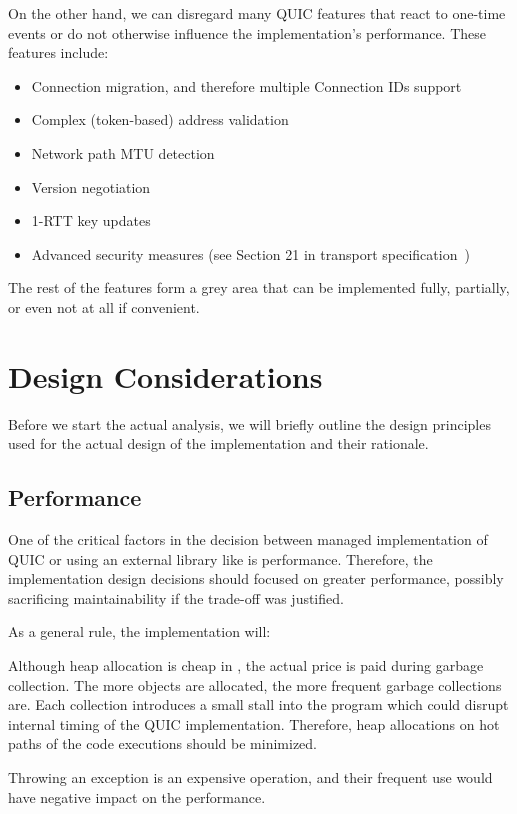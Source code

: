 On the other hand, we can disregard many QUIC features that react to one-time events or do not
otherwise influence the implementation's performance. These features include:

\begin{itemize}

    \item Connection migration, and therefore multiple Connection IDs support

    \item Complex (token-based) address validation

    \item Network path MTU detection

    \item Version negotiation

    \item 1-RTT key updates

    \item Advanced security measures (see Section 21 in transport
specification~\cite{draft-ietf-quic-transport})

\end{itemize}

The rest of the features form a grey area that can be implemented fully, partially, or even not at
all if convenient.

\section{Design Considerations}

Before we start the actual analysis, we will briefly outline the design principles used for the
actual design of the implementation and their rationale.

\subsection{Performance}

One of the critical factors in the decision between managed \dotnet{} implementation of QUIC or
using an external library like \libmsquic{} is performance. Therefore, the implementation design
decisions should focused on greater performance, possibly sacrificing maintainability if the
trade-off was justified.

As a general rule, the implementation will:

\begin{itemize}

     Although heap allocation is cheap in \dotnet{}, the
actual price is paid during garbage collection. The more objects are allocated, the more frequent
garbage collections are. Each collection introduces a small stall into the program which could
disrupt internal timing of the QUIC implementation. Therefore, heap allocations on hot paths of the
code executions should be minimized.

     Throwing an exception is an expensive operation, and
their frequent use would have negative impact on the performance.

\end{itemize}

